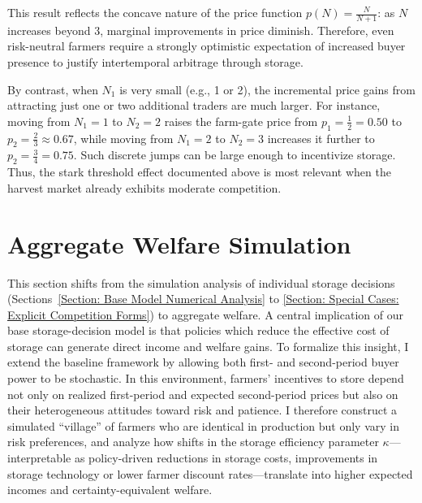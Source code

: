 This result reflects the concave nature of the price function $p(N) = \tfrac{N}{N+1}$: as $N$ increases beyond 3, marginal improvements in price diminish. Therefore, even risk-neutral farmers require a strongly optimistic expectation of increased buyer presence to justify intertemporal arbitrage through storage. 

By contrast, when $N_1$ is very small (e.g., 1 or 2), the incremental price gains from attracting just one or two additional traders are much larger. For instance, moving from $N_1=1$ to $N_2=2$ raises the farm-gate price from $p_1=\tfrac{1}{2}=0.50$ to $p_2=\tfrac{2}{3}\approx 0.67$, while moving from $N_1=2$ to $N_2=3$ increases it further to $p_2=\tfrac{3}{4}=0.75$. Such discrete jumps can be large enough to incentivize storage. Thus, the stark threshold effect documented above is most relevant when the harvest market already exhibits moderate competition.







\section{Aggregate Welfare Simulation}\label{subsec:agg_welfare}
\noindent
This section shifts from the simulation analysis of individual storage decisions (Sections~\ref{Section: Base Model Numerical Analysis} to \ref{Section: Special Cases: Explicit Competition Forms}) to aggregate welfare. A central implication of our base storage-decision model is that policies which reduce the effective cost of storage can generate direct income and welfare gains. To formalize this insight, I extend the baseline framework by allowing both first- and second-period buyer power to be stochastic. In this environment, farmers' incentives to store depend not only on realized first-period and expected second-period prices but also on their heterogeneous attitudes toward risk and patience. I therefore construct a simulated ``village'' of farmers who are identical in production but only vary in risk preferences, and analyze how shifts in the storage efficiency parameter $\kappa$---interpretable as policy-driven reductions in storage costs, improvements in storage technology or lower farmer discount rates---translate into higher expected incomes and certainty-equivalent welfare.



